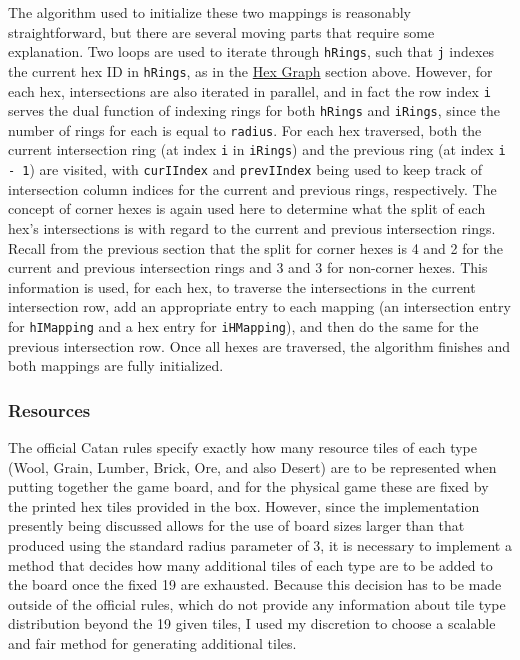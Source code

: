 \documentclass[pageno]{jpaper}
\begin{document}
\begin{doublespacing}
The algorithm used to initialize these two mappings is reasonably straightforward, but there are several moving parts that require some explanation. Two loops are used to iterate through \lstinline$hRings$, such that \lstinline$j$ indexes the current hex ID in \lstinline$hRings$, as in the \hyperlink{sec:hex_graph}{Hex Graph} section above. However, for each hex, intersections are also iterated in parallel, and in fact the row index \lstinline$i$ serves the dual function of indexing rings for both \lstinline$hRings$ and \lstinline$iRings$, since the number of rings for each is equal to \lstinline$radius$. For each hex traversed, both the current intersection ring (at index \lstinline$i$ in \lstinline$iRings$) and the previous ring (at index \lstinline$i - 1$) are visited, with \lstinline$curIIndex$ and \lstinline$prevIIndex$ being used to keep track of intersection column indices for the current and previous rings, respectively. The concept of corner hexes is again used here to determine what the split of each hex's intersections is with regard to the current and previous intersection rings. Recall from the previous section that the split for corner hexes is 4 and 2 for the current and previous intersection rings and 3 and 3 for non-corner hexes. This information is used, for each hex, to traverse the intersections in the current intersection row, add an appropriate entry to each mapping (an intersection entry for \lstinline$hIMapping$ and a hex entry for \lstinline$iHMapping$), and then do the same for the previous intersection row. Once all hexes are traversed, the algorithm finishes and both mappings are fully initialized.

\hypertarget{sec:resources}{}
\subsubsection{Resources}

The official Catan rules specify exactly how many resource tiles of each type (Wool, Grain, Lumber, Brick, Ore, and also Desert) are to be represented when putting together the game board, and for the physical game these are fixed by the printed hex tiles provided in the box. However, since the implementation presently being discussed allows for the use of board sizes larger than that produced using the standard radius parameter of 3, it is necessary to implement a method that decides how many additional tiles of each type are to be added to the board once the fixed 19 are exhausted. Because this decision has to be made outside of the official rules, which do not provide any information about tile type distribution beyond the 19 given tiles, I used my discretion to choose a scalable and fair method for generating additional tiles. 


\end{doublespacing}
\end{document}
